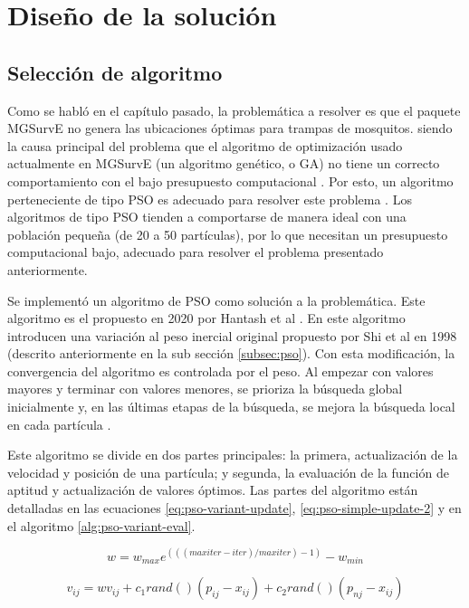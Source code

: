 \documentclass[letterpaper]{report}
\begin{document}
  \section{Diseño de la solución}
    \subsection{Selección de algoritmo}
    Como se habló en el capítulo pasado, la problemática a resolver es que el
    paquete MGSurvE no genera las ubicaciones óptimas para trampas de mosquitos.
    siendo la causa principal del
    problema que el algoritmo de optimización usado actualmente en MGSurvE
    (un algoritmo genético, o GA) no tiene un correcto comportamiento con el
    bajo presupuesto computacional \cite{SwarmVsEvol}. Por esto, un algoritmo
    perteneciente de tipo PSO es adecuado para resolver
    este problema \cite{SwarmVsEvol,PSOPopulationSize}. Los algoritmos de tipo
    PSO tienden a comportarse de manera ideal con una población pequeña (de 20
    a 50 partículas), por lo que necesitan un presupuesto computacional bajo,
    adecuado para resolver el problema presentado anteriormente.

    Se implementó un algoritmo de PSO como solución a la problemática. Este
    algoritmo es el propuesto
    en 2020 por Hantash et al \cite{PSOEnergy}. En este algoritmo introducen una
    variación al peso inercial original propuesto por Shi et al \cite{CPSO} en
    1998 (descrito anteriormente en la sub sección \ref{subsec:pso}). Con esta
    modificación, la convergencia del algoritmo es controlada por el peso. Al 
    empezar con valores mayores y terminar con valores menores, se prioriza la
    búsqueda global inicialmente y, en las últimas etapas de la búsqueda, se
    mejora la búsqueda local en cada partícula \cite{CPSO}.

    Este algoritmo se divide en dos
    partes principales: la primera, actualización de la velocidad y posición de
    una partícula; y segunda, la evaluación de la función de aptitud y
    actualización de valores óptimos. Las partes del algoritmo están detalladas
    en las ecuaciones \ref{eq:pso-variant-update}, \ref{eq:pso-simple-update-2}
    y en el algoritmo \ref{alg:pso-variant-eval}.

    \begin{equation}
      \label{eq:pso-weight-update}
      w = w_{max} e^{(((maxiter - iter) / maxiter) - 1)} - w_{min} 
    \end{equation}

    \begin{equation}
      v_{ij} = w v_{ij} + c_1 rand()(p_{ij} - x_{ij}) + c_2 rand()(p_{nj}
        - x_{ij})
      \label{eq:pso-variant-update}
    \end{equation}
\end{document}
